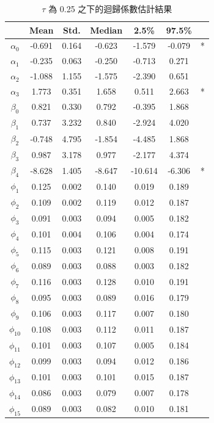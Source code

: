 \documentclass[12pt,a4paper]{article}
\begin{document}
\begin{CJK}{UTF8}{bkai}
\begin{table}
\centering
\setlength{\belowcaptionskip}{0.5cm}
\caption{$\tau$ 為 0.25 之下的迴歸係數估計結果}
\begin{tabular}{ccccccc}
\hline
& Mean & Std.& Median & 2.5\% & 97.5\% &\\
\hline
$\alpha_0$ & -0.691 & 0.164 & -0.623 & -1.579 & -0.079 & *\\
$\alpha_1$ & -0.235 & 0.063 & -0.250 & -0.713 &  0.271 &  \\
$\alpha_2$ & -1.088 & 1.155 & -1.575 & -2.390 &  0.651 &  \\
$\alpha_3$ &  1.773 & 0.351 &  1.658 &  0.511 &  2.663 & *\\
$\beta_0$  &  0.821 & 0.330 &  0.792 & -0.395 &  1.868 &  \\
$\beta_1$  &  0.737 & 3.232 &  0.840 & -2.924 &  4.020 &  \\
$\beta_2$  & -0.748 & 4.795 & -1.854 & -4.485 &  1.868 &  \\
$\beta_3$  &  0.987 & 3.178 &  0.977 & -2.177 &  4.374 &  \\
$\beta_4$  & -8.628 & 1.405 & -8.647 &-10.614 & -6.306 & *\\
\hline
$ \phi_1$   & 0.125 & 0.002 & 0.140 & 0.019 & 0.189 & \\
$ \phi_2$   & 0.109 & 0.002 & 0.119 & 0.012 & 0.187 & \\
$ \phi_3$   & 0.091 & 0.003 & 0.094 & 0.005 & 0.182 & \\
$ \phi_4$   & 0.101 & 0.004 & 0.106 & 0.004 & 0.174 & \\
$ \phi_5$   & 0.115 & 0.003 & 0.121 & 0.008 & 0.191 & \\
$ \phi_6$   & 0.089 & 0.003 & 0.088 & 0.003 & 0.182 & \\
$ \phi_7$   & 0.116 & 0.003 & 0.128 & 0.010 & 0.191 & \\
$ \phi_8$   & 0.095 & 0.003 & 0.089 & 0.016 & 0.179 & \\
$ \phi_9$   & 0.106 & 0.003 & 0.117 & 0.007 & 0.180 & \\
$\phi_{10}$ & 0.108 & 0.003 & 0.112 & 0.011 & 0.187 & \\
$\phi_{11}$ & 0.101 & 0.003 & 0.107 & 0.005 & 0.184 & \\
$\phi_{12}$ & 0.099 & 0.003 & 0.094 & 0.012 & 0.186 & \\
$\phi_{13}$ & 0.101 & 0.003 & 0.101 & 0.015 & 0.187 & \\
$\phi_{14}$ & 0.086 & 0.003 & 0.079 & 0.007 & 0.178 & \\
$\phi_{15}$ & 0.089 & 0.003 & 0.082 & 0.010 & 0.181 & \\

\end{tabular}
\end{table}
\end{CJK}
\end{document}
